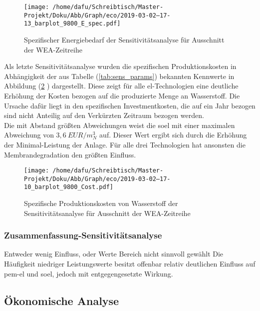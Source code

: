 \documentclass[onecolumn,10pt,titlepage]{article}
\begin{document}
\begin{figure}[H]
	\centering
	\texttt{[image: /home/dafu/Schreibtisch/Master-Projekt/Doku/Abb/Graph/eco/2019-03-02--17-13\_barplot\_9800\_E\_spec.pdf]}
	\caption[Spezifischer Energiebedarf; Sensitivitätsanalyse]{Spezifischer Energiebedarf der Sensitivitätsanalyse für Ausschnitt der WEA-Zeitreihe}
	\label{fig:barplot_eco_9800_Espec}
\end{figure}
Als letzte Sensitivitätsanalyse wurden die spezifischen Produktionskosten in Abhängigkeit der aus Tabelle (\ref{tab:sens_params}) bekannten Kennwerte in Abbildung (\ref{fig:barplot_eco_9800_Cost} ) dargestellt. Diese zeigt für alle \gls{el}-Technologien eine deutliche Erhöhung der Kosten bezogen auf die produzierte Menge an Wasserstoff. Die Ursache dafür liegt in den spezifischen Investmentkosten, die auf ein Jahr bezogen sind nicht Anteilig auf den Verkürzten Zeitraum bezogen werden.\\
Die mit Abstand größten Abweichungen weist die \gls{soel} mit einer maximalen Abweichung von $3,6~EUR/m^3_N$ auf. Dieser Wert ergibt sich durch die Erhöhung der Minimal-Leistung der Anlage. Für alle drei Technologien hat ansonsten die Membrandegradation den größten Einfluss.

\begin{figure}[H]
	\centering
	\texttt{[image: /home/dafu/Schreibtisch/Master-Projekt/Doku/Abb/Graph/eco/2019-03-02--17-10\_barplot\_9800\_Cost.pdf]}
	\caption[Spezifische Produktionskosten; Sensitivitätsanalyse]{Spezifische Produktionskosten von Wasserstoff der Sensitivitätsanalyse für Ausschnitt der WEA-Zeitreihe}
	\label{fig:barplot_eco_9800_Cost}
\end{figure}
\subsubsection{Zusammenfassung-Sensitivitätsanalyse}
Entweder wenig Einfluss, oder Werte Bereich nicht sinnvoll gewählt
Die Häufigkeit niedriger Leistungswerte besitzt offenbar relativ deutlichen Einfluss auf \gls{pem}-\gls{el} und \gls{soel}, jedoch mit entgegengesetzte Wirkung.

\subsection{Ökonomische Analyse}
\end{document}
